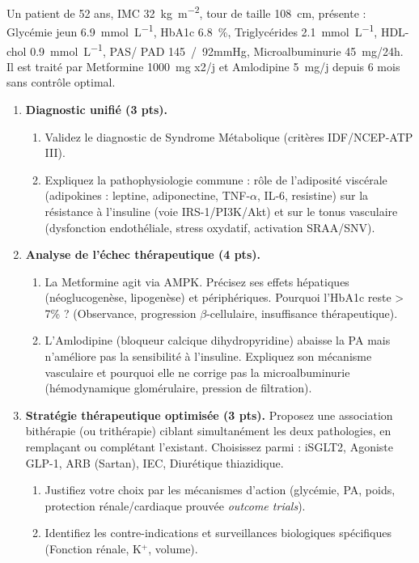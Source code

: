 \documentclass[11pt]{article}
\begin{document}
\begin{exercice}
Un patient de 52 ans, IMC \SI{32}{kg.m^{-2}}, tour de taille \SI{108}{cm}, présente : Glycémie jeun \SI{6,9}{mmol.L^{-1}}, HbA1c \SI{6,8}{\%}, Triglycérides \SI{2,1}{mmol.L^{-1}}, HDL-chol \SI{0,9}{mmol.L^{-1}}, PAS/ PAD \SI{145}{/92}{mmHg}, Microalbuminurie \SI{45}{mg/24h}. Il est traité par Metformine \SI{1000}{mg} x2/j et Amlodipine \SI{5}{mg}/j depuis 6 mois sans contrôle optimal.

\begin{enumerate}
    \item \textbf{Diagnostic unifié (3 pts).} 
    \begin{enumerate}
        \item Validez le diagnostic de Syndrome Métabolique (critères IDF/NCEP-ATP III). 
        \item Expliquez la pathophysiologie commune : rôle de l'adiposité viscérale (adipokines : leptine, adiponectine, TNF-$\alpha$, IL-6, resistine) sur la résistance à l'insuline (voie IRS-1/PI3K/Akt) et sur le tonus vasculaire (dysfonction endothéliale, stress oxydatif, activation SRAA/SNV).
    \end{enumerate}
    \item \textbf{Analyse de l'échec thérapeutique (4 pts).} 
    \begin{enumerate}
        \item La Metformine agit via AMPK. Précisez ses effets hépatiques (néoglucogenèse, lipogenèse) et périphériques. Pourquoi l'HbA1c reste > 7\% ? (Observance, progression $\beta$-cellulaire, insuffisance thérapeutique).
        \item L'Amlodipine (bloqueur calcique dihydropyridine) abaisse la PA mais n'améliore pas la sensibilité à l'insuline. Expliquez son mécanisme vasculaire et pourquoi elle ne corrige pas la microalbuminurie (hémodynamique glomérulaire, pression de filtration).
    \end{enumerate}
    \item \textbf{Stratégie thérapeutique optimisée (3 pts).} Proposez une association bithérapie (ou trithérapie) ciblant simultanément les deux pathologies, en remplaçant ou complétant l'existant. Choisissez parmi : iSGLT2, Agoniste GLP-1, ARB (Sartan), IEC, Diurétique thiazidique.
    \begin{enumerate}
        \item Justifiez votre choix par les mécanismes d'action (glycémie, PA, poids, protection rénale/cardiaque prouvée \textit{outcome trials}).
        \item Identifiez les contre-indications et surveillances biologiques spécifiques (Fonction rénale, K$^+$, volume).
    \end{enumerate}
\end{enumerate}
\end{exercice}
\end{document}
